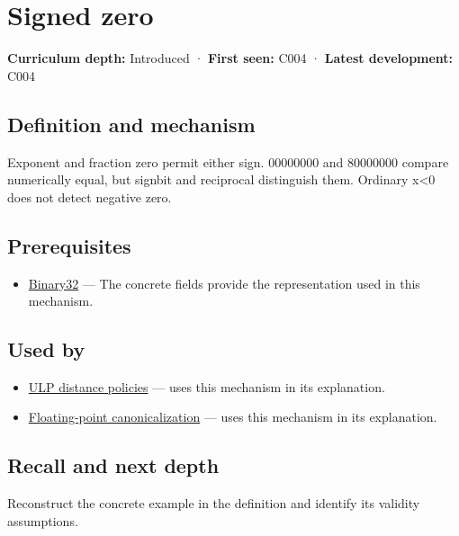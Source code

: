 \hypertarget{appendix-3a048f032c1f}{}
\section{Signed zero}\label{appendix-3a048f032c1f-signed-zero}

\textbf{Curriculum depth:} Introduced · \textbf{First seen:} C004 · \textbf{Latest development:} C004

\subsection{Definition and mechanism}\label{appendix-3a048f032c1f-definition-and-mechanism}

Exponent and fraction zero permit either sign. 00000000 and 80000000 compare numerically equal, but signbit and reciprocal distinguish them. Ordinary x\textless0 does not detect negative zero.

\subsection{Prerequisites}\label{appendix-3a048f032c1f-prerequisites}

\begin{itemize}
\tightlist
\item
  \hyperref[appendix-5057f9ad327f]{Binary32} --- The concrete fields provide the representation used in this mechanism.
\end{itemize}

\subsection{Used by}\label{appendix-3a048f032c1f-used-by}

\begin{itemize}
\tightlist
\item
  \hyperref[appendix-deca299ae4b8]{ULP distance policies} --- uses this mechanism in its explanation.
\item
  \hyperref[appendix-e90053a4b201]{Floating-point canonicalization} --- uses this mechanism in its explanation.
\end{itemize}

\subsection{Recall and next depth}\label{appendix-3a048f032c1f-recall-and-next-depth}

Reconstruct the concrete example in the definition and identify its validity assumptions.

